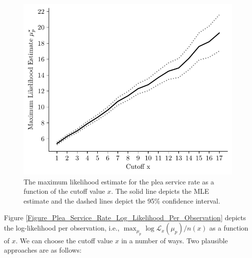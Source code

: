 \documentclass[11pt, oneside]{article}   	%
\theoremstyle{ModifiedStyle}
\begin{document}
			\begin{figure}[H]
				\centering
				\includegraphics[scale=0.75]{Figures/Likelihood_Estiamtes_Top}
				\vspace{-2mm}
				\caption{The maximum likelihood estimate for the plea service rate as a function of the cutoff value $x$. The solid line depicts the MLE estimate and the dashed lines depict the 95\% confidence interval.}
				\label{Figure_Plea_Service_Rate_MLE_Estimate}
			\end{figure}
			Figure \ref{Figure_Plea_Service_Rate_Log_Likelihood_Per_Observation} depicts the log-likelihood per observation, i.e., $\max_{\mu_p} \log \mathcal{L}_x(\mu_p)/n(x)$ as a function of $x$. We can choose the cutoff value $x$ in a number of ways. Two plausible approaches are as follows:
\end{document}
